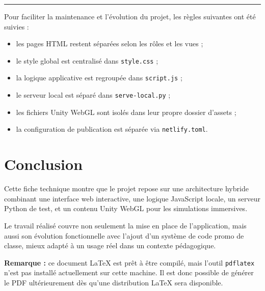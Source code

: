 \documentclass[12pt,a4paper]{report}
\newcommand{\sectionline}{
  \vspace{0.3em}
  \noindent\color{mainline}\rule{\textwidth}{1.5pt}
  \vspace{0.6em}
}
\begin{document}
\sectionline

Pour faciliter la maintenance et l'évolution du projet, les règles suivantes ont été suivies :

\begin{itemize}[leftmargin=1.2cm]
  \item les pages HTML restent séparées selon les rôles et les vues ;
  \item le style global est centralisé dans \texttt{style.css} ;
  \item la logique applicative est regroupée dans \texttt{script.js} ;
  \item le serveur local est séparé dans \texttt{serve-local.py} ;
  \item les fichiers Unity WebGL sont isolés dans leur propre dossier d'assets ;
  \item la configuration de publication est séparée via \texttt{netlify.toml}.
\end{itemize}

\section{Conclusion}

Cette fiche technique montre que le projet repose sur une architecture hybride combinant
une interface web interactive, une logique JavaScript locale, un serveur Python de test,
et un contenu Unity WebGL pour les simulations immersives.

Le travail réalisé couvre non seulement la mise en place de l'application, mais aussi son
évolution fonctionnelle avec l'ajout d'un système de code promo de classe, mieux adapté à
un usage réel dans un contexte pédagogique.

\vspace{1em}

\textbf{Remarque :} ce document LaTeX est prêt à être compilé, mais l'outil \texttt{pdflatex}
n'est pas installé actuellement sur cette machine. Il est donc possible de générer le PDF
ultérieurement dès qu'une distribution LaTeX sera disponible.
\end{document}
